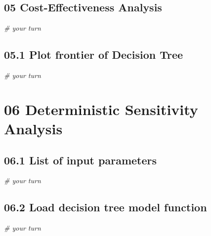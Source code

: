 \documentclass[
]{article}
\newenvironment{Shaded}{\begin{snugshade}}{\end{snugshade}}
\newcommand{\CommentTok}[1]{\textcolor[rgb]{0.56,0.35,0.01}{\textit{#1}}}
\begin{document}
\hypertarget{cost-effectiveness-analysis}{%
\subsection{05 Cost-Effectiveness
Analysis}\label{cost-effectiveness-analysis}}

\begin{Shaded}
\begin{Highlighting}[]
\CommentTok{# your turn}
\end{Highlighting}
\end{Shaded}

\hypertarget{plot-frontier-of-decision-tree}{%
\subsection{05.1 Plot frontier of Decision
Tree}\label{plot-frontier-of-decision-tree}}

\begin{Shaded}
\begin{Highlighting}[]
\CommentTok{# your turn}
\end{Highlighting}
\end{Shaded}

\hypertarget{deterministic-sensitivity-analysis}{%
\section{06 Deterministic Sensitivity
Analysis}\label{deterministic-sensitivity-analysis}}

\hypertarget{list-of-input-parameters}{%
\subsection{06.1 List of input
parameters}\label{list-of-input-parameters}}

\begin{Shaded}
\begin{Highlighting}[]
\CommentTok{# your turn}
\end{Highlighting}
\end{Shaded}

\hypertarget{load-decision-tree-model-function}{%
\subsection{06.2 Load decision tree model
function}\label{load-decision-tree-model-function}}

\begin{Shaded}
\begin{Highlighting}[]
\CommentTok{# your turn}
\end{Highlighting}
\end{Shaded}
\end{document}
